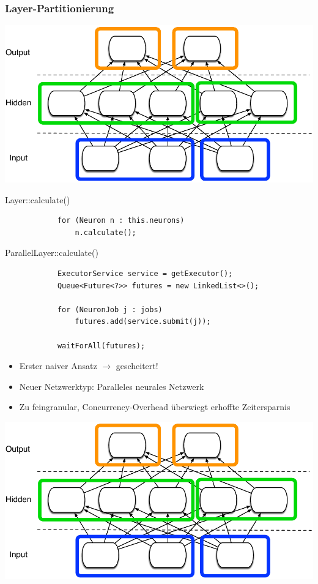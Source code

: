 \documentclass[18pt]{beamer}
\begin{document}
	\begin{frame}\frametitle{Layer-Partitionierung}
	    \includegraphics[scale=0.7]{Grafiken/Feingranular.pdf}
	
	\framebreak

		\begin{block}{Layer::calculate()}
			\begin{lstlisting}
			for (Neuron n : this.neurons) 
			    n.calculate();
	 		\end{lstlisting}
 		\end{block}

		\begin{block}{ParallelLayer::calculate()}
	 		\begin{lstlisting}
			ExecutorService service = getExecutor();
			Queue<Future<?>> futures = new LinkedList<>();

			for (NeuronJob j : jobs)
			    futures.add(service.submit(j));
			
			waitForAll(futures);
	 		\end{lstlisting}
	 	\end{block}

 		\framebreak
	
		\begin{itemize}
			\item Erster naiver Ansatz $\rightarrow$ gescheitert!		
			\item Neuer Netzwerktyp: Paralleles neurales Netzwerk
			\item Zu feingranular, Concurrency-Overhead überwiegt erhoffte Zeitersparnis
			
		\end{itemize}	
		\begin{center}
			\includegraphics[scale=0.25]{Grafiken/Feingranular.pdf}
		\end{center}
	\end{frame}
	
\end{document}
